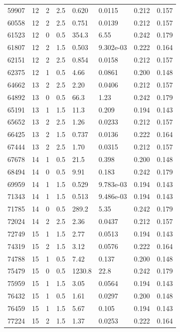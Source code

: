\documentclass[preview]{standalone}
\begin{document}
{{{\begin{tabular}{L{1.2cm}C{1.2cm} C{0.3cm}C{0.5cm} C{1.4cm}C{1.4cm} C{1.4cm}C{1.4cm}}
  59907  &    12  & 2     & 2.5 &  0.620  & 0.0115  & 0.212 &  0.157   \\ 
  60558  &    12  & 2     & 2.5 &  0.751  & 0.0139  & 0.212 &  0.157   \\ 
  61523  &    12  & 0     & 0.5 &  354.3  & 6.55  & 0.242 &  0.179   \\ 
  61807  &    12  & 2     & 1.5 &  0.503  & 9.302e-03  & 0.222 &  0.164   \\ 
  62151  &    12  & 2     & 2.5 &  0.854  & 0.0158  & 0.212 &  0.157   \\ 
  62375  &    12  & 1     & 0.5 &  4.66  & 0.0861  & 0.200 &  0.148   \\ 
  64662  &    13  & 2     & 2.5 &  2.20  & 0.0406  & 0.212 &  0.157   \\ 
  64892  &    13  & 0     & 0.5 &  66.3  & 1.23  & 0.242 &  0.179   \\ 
  65191  &    13  & 1     & 1.5 &  11.3  & 0.209  & 0.194 &  0.143   \\ 
  65652  &    13  & 2     & 2.5 &  1.26  & 0.0233  & 0.212 &  0.157   \\ 
  66425  &    13  & 2     & 1.5 &  0.737  & 0.0136  & 0.222 &  0.164   \\ 
  67444  &    13  & 2     & 2.5 &  1.70  & 0.0315  & 0.212 &  0.157   \\ 
  67678  &    14  & 1     & 0.5 &  21.5  & 0.398  & 0.200 &  0.148   \\ 
  68494  &    14  & 0     & 0.5 &  9.91  & 0.183  & 0.242 &  0.179   \\ 
  69959  &    14  & 1     & 1.5 &  0.529  & 9.783e-03  & 0.194 &  0.143   \\ 
  71343  &    14  & 1     & 1.5 &  0.513  & 9.486e-03  & 0.194 &  0.143   \\ 
  71785  &    14  & 0     & 0.5 &  289.2  & 5.35  & 0.242 &  0.179   \\ 
  72024  &    14  & 2     & 2.5 &  2.36  & 0.0437  & 0.212 &  0.157   \\ 
  72749  &    15  & 1     & 1.5 &  2.77  & 0.0513  & 0.194 &  0.143   \\ 
  74319  &    15  & 2     & 1.5 &  3.12  & 0.0576  & 0.222 &  0.164   \\ 
  74788  &    15  & 1     & 0.5 &  7.42  & 0.137  & 0.200 &  0.148   \\ 
  75479  &    15  & 0     & 0.5 &  1230.8  & 22.8  & 0.242 &  0.179   \\ 
  75959  &    15  & 1     & 1.5 &  3.05  & 0.0564  & 0.194 &  0.143   \\ 
  76432  &    15  & 1     & 0.5 &  1.61  & 0.0297  & 0.200 &  0.148   \\ 
  76459  &    15  & 1     & 1.5 &  5.67  & 0.105  & 0.194 &  0.143   \\ 
  77224  &    15  & 2     & 1.5 &  1.37  & 0.0253  & 0.222 &  0.164   \\ 
\hline 
\end{tabular} 

}}}
\end{document}
